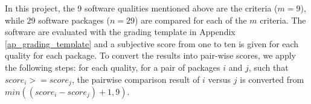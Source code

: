 In this project, the 9 software qualities mentioned above are the criteria ($m = 9$), while 29 software packages ($n = 29$) are compared for each of the $m$ criteria. The software are evaluated with the grading template in Appendix \ref{ap_grading_template} and a subjective score from one to ten is given for each quality for each package. To convert the results into pair-wise scores, we apply the following steps: for each quality, for a pair of packages $i$ and $j$, such that $score_i >= score_j$, the pairwise comparison result of $i$ versus $j$ is converted from $min((score_i - score_j) + 1, 9)$.
